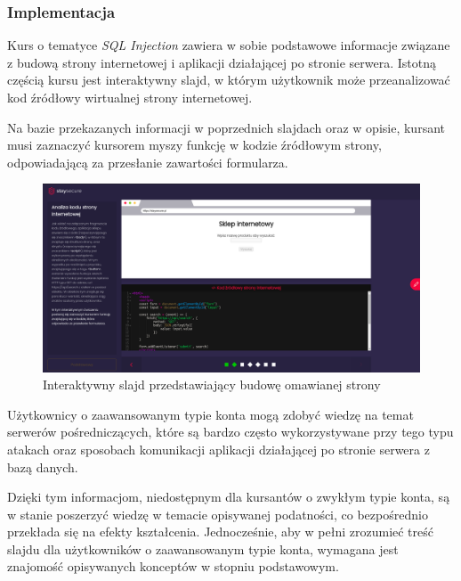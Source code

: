 \documentclass[12pt,twoside]{article}
\begin{document}
\subsubsection{Implementacja}

Kurs o tematyce \emph{SQL Injection} zawiera w sobie podstawowe informacje związane z budową strony internetowej i aplikacji działającej po stronie serwera. Istotną częścią kursu jest interaktywny slajd, w którym użytkownik może przeanalizować kod źródłowy wirtualnej strony internetowej. 

Na bazie przekazanych informacji w poprzednich slajdach oraz w opisie, kursant musi zaznaczyć kursorem myszy funkcję w kodzie źródłowym strony, odpowiadającą za przesłanie zawartości formularza.

\begin{figure}[H]
	\centering
	\includegraphics[width=1\linewidth]{figures/sql-slide-screenshot1.png}
	\caption{Interaktywny slajd przedstawiający budowę omawianej strony}
	\label{Fig:Interaktywny slajd przedstawiający budowę omawianej strony}
\end{figure} 

Użytkownicy o zaawansowanym typie konta mogą zdobyć wiedzę na temat serwerów pośredniczących, które są bardzo często wykorzystywane przy tego typu atakach oraz sposobach komunikacji aplikacji działającej po stronie serwera z bazą danych. 

Dzięki tym informacjom, niedostępnym dla kursantów o zwykłym typie konta, są w stanie poszerzyć wiedzę w temacie opisywanej podatności, co bezpośrednio przekłada się na efekty kształcenia. Jednocześnie, aby w pełni zrozumieć treść slajdu dla użytkowników o zaawansowanym typie konta, wymagana jest znajomość opisywanych konceptów w stopniu podstawowym.
\end{document}
